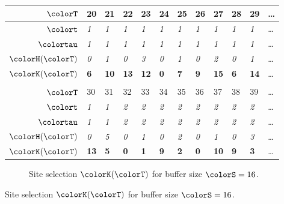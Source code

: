 \begin{figure}[htbp!]
\begin{minipage}{\linewidth}
\begin{tabularx}{\linewidth}{@{}r|*{11}{Y}@{}}
  { $\colorT$} &
    {20} & {21} & {22} & {23} & {24}
    & {25} & {26} & {27} & {28} & {29} & \ldots \\ \hline
  { $\colort$} &
    \textit{1} & \textit{1} & \textit{1} & \textit{1} & \textit{1} & \textit{1} & \textit{1} & \textit{1} & \textit{1} & \textit{1} & \ldots \\
  { $\colortau$} &
    \textit{1} & \textit{1} & \textit{1} & \textit{1} & \textit{1} & \textit{1} & \textit{1} & \textit{1} & \textit{1} & \textit{1} & \ldots \\
  { $\colorH(\colorT)$} &
    \textit{0} & \textit{1} & \textit{0} & \textit{3} & \textit{0} & \textit{1} & \textit{0} & \textit{2} & \textit{0} & \textit{1} & \ldots \\
  { $\colorK(\colorT)$} &
    \textbf{6} & \textbf{10} & \textbf{13} & \textbf{12} & \textbf{0}
    & \textbf{7} & \textbf{9} & \textbf{15} & \textbf{6} & \textbf{14} & \ldots \\
   \\[1ex]

  { $\colorT$} &
    {30} & {31} & {32} & {33} & {34}
    & {35} & {36} & {37} & {38} & {39} & \ldots \\ \hline
  { $\colort$} &
    \textit{1} & \textit{1} & \textit{2} & \textit{2} & \textit{2} & \textit{2} & \textit{2} & \textit{2} & \textit{2} & \textit{2} & \ldots \\
  { $\colortau$} &
    \textit{1} & \textit{1} & \textit{2} & \textit{2} & \textit{2} & \textit{2} & \textit{2} & \textit{2} & \textit{2} & \textit{2} & \ldots \\
  { $\colorH(\colorT)$} &
    \textit{0} & \textit{5} & \textit{0} & \textit{1} & \textit{0} & \textit{2} & \textit{0} & \textit{1} & \textit{0} & \textit{3} & \ldots \\
  { $\colorK(\colorT)$} &
    \textbf{13} & \textbf{5} & \textbf{0} & \textbf{1} & \textbf{9}
    & \textbf{2} & \textbf{0} & \textbf{10} & \textbf{9} & \textbf{3} & \ldots \\
  \end{tabularx}
  \vspace{-2ex}
\end{minipage}


\begin{subfigure}{\linewidth}
\caption{\footnotesize Site selection $\colorK(\colorT)$ for buffer size $\colorS=16$.}
\label{fig:hsurf-tilted-implementation-site-selection}
\end{subfigure}
\vspace{-3ex}


\end{figure}
